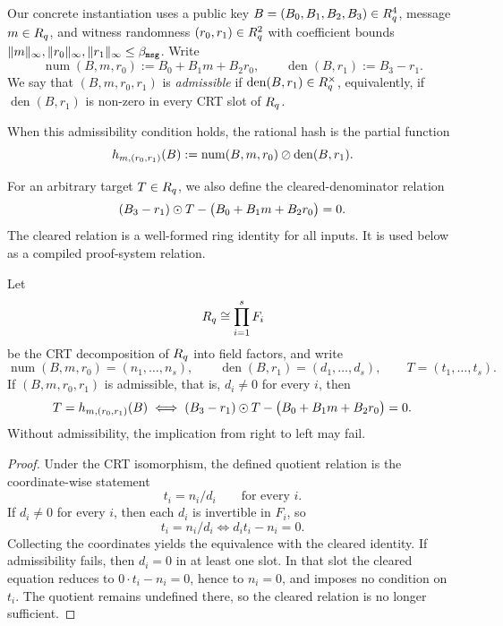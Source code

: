 \begin{definition}\label{def:rational-hash}
Our concrete instantiation uses a public key \(B=(B_0,B_1,B_2,B_3)\in R_q^4\), message \(m\in R_q\), and witness
randomness \((r_0,r_1)\in R_q^2\) with coefficient bounds
\(\|m\|_\infty,\|r_0\|_\infty,\|r_1\|_\infty\le \beta_{\mathtt{msg}}\). Write
\[
\operatorname{num}(B,m,r_0):=B_0+B_1m+B_2r_0,
\qquad
\operatorname{den}(B,r_1):=B_3-r_1.
\]
We say that \((B,m,r_0,r_1)\) is \emph{admissible} if \(\operatorname{den}(B,r_1)\in R_q^\times\), equivalently, if
\(\operatorname{den}(B,r_1)\) is non-zero in every CRT slot of \(R_q\).

When this admissibility condition holds, the rational hash is the partial function
\[
h_{m,(r_0,r_1)}(B):=\operatorname{num}(B,m,r_0)\oslash \operatorname{den}(B,r_1).
\]

For an arbitrary target \(T\in R_q\), we also define the cleared-denominator relation
\begin{equation}\label{eq:hash-cleared}
  (B_3-r_1)\odot T-\bigl(B_0+B_1m+B_2r_0\bigr)=0.
\end{equation}
The cleared relation is a well-formed ring identity for all inputs. It is used below as a compiled proof-system
relation.
\end{definition}

\begin{lemma}\label{lem:hash-cleared-admissible}
Let
\[
R_q \cong \prod_{i=1}^s F_i
\]
be the CRT decomposition of \(R_q\) into field factors, and write
\[
\operatorname{num}(B,m,r_0)=(n_1,\ldots,n_s),\qquad
\operatorname{den}(B,r_1)=(d_1,\ldots,d_s),\qquad
T=(t_1,\ldots,t_s).
\]
If \((B,m,r_0,r_1)\) is admissible, that is, \(d_i\neq 0\) for every \(i\), then
\[
T=h_{m,(r_0,r_1)}(B)
\iff
(B_3-r_1)\odot T-\bigl(B_0+B_1m+B_2r_0\bigr)=0.
\]
Without admissibility, the implication from right to left may fail.
\end{lemma}

\begin{proof}
Under the CRT isomorphism, the defined quotient relation is the coordinate-wise statement
\[
t_i=n_i/d_i
\qquad\text{for every }i.
\]
If \(d_i\neq 0\) for every \(i\), then each \(d_i\) is invertible in \(F_i\), so
\[
t_i=n_i/d_i
\iff
d_it_i-n_i=0.
\]
Collecting the coordinates yields the equivalence with the cleared identity. If admissibility fails, then \(d_i=0\) in
at least one slot. In that slot the cleared equation reduces to \(0\cdot t_i-n_i=0\), hence to \(n_i=0\), and imposes
no condition on \(t_i\). The quotient remains undefined there, so the cleared relation is no longer sufficient.
\end{proof}

